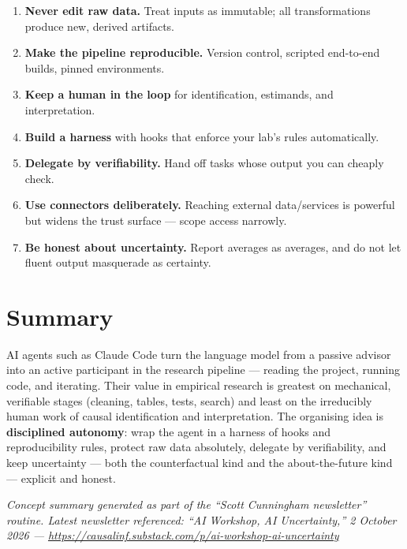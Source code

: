 \documentclass[11pt]{article}
\begin{document}
\begin{enumerate}[leftmargin=1.4em]
  \item \textbf{Never edit raw data.} Treat inputs as immutable; all
  transformations produce new, derived artifacts.
  \item \textbf{Make the pipeline reproducible.} Version control, scripted
  end-to-end builds, pinned environments.
  \item \textbf{Keep a human in the loop} for identification, estimands, and
  interpretation.
  \item \textbf{Build a harness} with hooks that enforce your lab's rules
  automatically.
  \item \textbf{Delegate by verifiability.} Hand off tasks whose output you can
  cheaply check.
  \item \textbf{Use connectors deliberately.} Reaching external data/services is
  powerful but widens the trust surface --- scope access narrowly.
  \item \textbf{Be honest about uncertainty.} Report averages as averages, and
  do not let fluent output masquerade as certainty.
\end{enumerate}

\section{Summary}

AI agents such as Claude Code turn the language model from a passive advisor into
an active participant in the research pipeline --- reading the project, running
code, and iterating. Their value in empirical research is greatest on
mechanical, verifiable stages (cleaning, tables, tests, search) and least on the
irreducibly human work of causal identification and interpretation. The
organising idea is \textbf{disciplined autonomy}: wrap the agent in a harness of
hooks and reproducibility rules, protect raw data absolutely, delegate by
verifiability, and keep uncertainty --- both the counterfactual kind and the
about-the-future kind --- explicit and honest.

\vfill
\begin{center}
\small\itshape
Concept summary generated as part of the ``Scott Cunningham newsletter'' routine.
Latest newsletter referenced: ``AI Workshop, AI Uncertainty,'' 2 October 2026 ---
\url{https://causalinf.substack.com/p/ai-workshop-ai-uncertainty}
\end{center}
\end{document}
